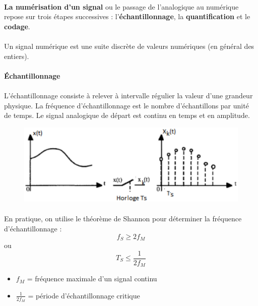 \documentclass{article}
\begin{document}
\paragraph{}
\textbf{La numérisation d'un signal} ou le passage de l'analogique au numérique repose sur trois étapes successives : l'\textbf{échantillonnage}, la \textbf{quantification} et le \textbf{codage}.

\paragraph{}
Un signal numérique est une suite discrète de valeurs numériques (en général des entiers).

\paragraph{Échantillonnage}
\paragraph{}
L'échantillonnage consiste à relever à intervalle régulier la valeur d'une grandeur physique. La fréquence d'échantillonnage est le nombre d'échantillons par unité de temps. Le signal analogique de départ est continu en temps et en amplitude.

\begin{figure}[H]
    \centering
    \includegraphics[width=0.6\linewidth]{images/echantillonnage.png}    
\end{figure}

\paragraph{}
En pratique, on utilise le théorème de Shannon pour déterminer la fréquence d'échantillonnage :
$$f_S \ge 2f_M$$ ou $$T_S \le \frac{1}{2f_M}$$
\begin{itemize}
    \item $f_M$ = fréquence maximale d'un signal continu
    \item $\frac{1}{2f_M}$ = période d'échantillonnage critique
\end{itemize}
\end{document}
